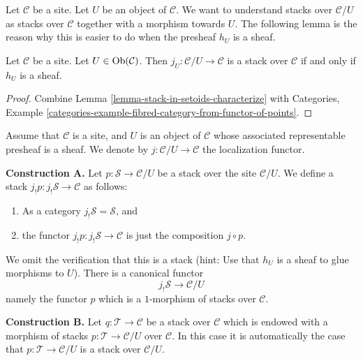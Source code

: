 \noindent
Let $\mathcal{C}$ be a site.
Let $U$ be an object of $\mathcal{C}$.
We want to understand stacks over $\mathcal{C}/U$ as stacks
over $\mathcal{C}$ together with a morphism towards $U$.
The following lemma is the reason why this is easier to do
when the presheaf $h_U$ is a sheaf.

\begin{lemma}
\label{lemma-when-localization-stack}
Let $\mathcal{C}$ be a site. Let $U \in \mathop{\mathrm{Ob}}\nolimits(\mathcal{C})$.
Then $j_U : \mathcal{C}/U \to \mathcal{C}$ is a stack over $\mathcal{C}$
if and only if $h_U$ is a sheaf.
\end{lemma}

\begin{proof}
Combine
Lemma \ref{lemma-stack-in-setoids-characterize}
with
Categories,
Example \ref{categories-example-fibred-category-from-functor-of-points}.
\end{proof}

\noindent
Assume that $\mathcal{C}$ is a site,
and $U$ is an object of $\mathcal{C}$ whose associated representable
presheaf is a sheaf. We denote by $j : \mathcal{C}/U \to \mathcal{C}$
the localization functor.

\medskip\noindent
{\bf Construction A.} Let $p : \mathcal{S} \to \mathcal{C}/U$ be a stack
over the site $\mathcal{C}/U$. We define a stack
$j_!p : j_!\mathcal{S} \to \mathcal{C}$ as follows:
\begin{enumerate}
\item As a category $j_!\mathcal{S} = \mathcal{S}$, and
\item the functor $j_!p : j_!\mathcal{S} \to \mathcal{C}$
is just the composition $j \circ p$.
\end{enumerate}
We omit the verification that this is a stack (hint: Use that
$h_U$ is a sheaf to glue morphisms to $U$). There is a canonical
functor
$$
j_!\mathcal{S} \longrightarrow \mathcal{C}/U
$$
namely the functor $p$ which is a $1$-morphism of stacks over $\mathcal{C}$.

\medskip\noindent
{\bf Construction B.}
Let $q : \mathcal{T} \to \mathcal{C}$ be a stack over $\mathcal{C}$
which is endowed with a morphism of stacks $p : \mathcal{T} \to \mathcal{C}/U$
over $\mathcal{C}$. In this case it is automatically the case that
$p : \mathcal{T} \to \mathcal{C}/U$ is a stack over $\mathcal{C}/U$.

